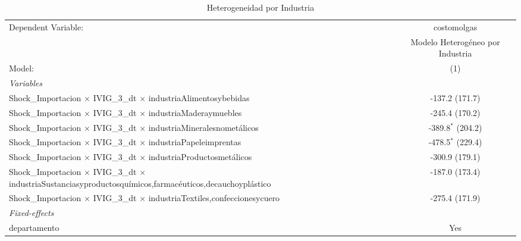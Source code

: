\documentclass[12pt]{article}
\begin{document}
\setcounter{table}{7}
\begin{table}[htbp]
\centering
\begin{threeparttable}

   \caption{Heterogeneidad por Industria}
   \centering
   \small
   \begin{tabular}{lc}
      \tabularnewline \midrule \midrule
      Dependent Variable:                                                                                                         & costomolgas\\  
                                                                                                                                  & Modelo Heterogéneo por Industria \\   
      Model:                                                                                                                      & (1)\\  
      \midrule
      \emph{Variables}\\
      Shock\_Importacion $\times$ IVIG\_3\_dt $\times$ industriaAlimentosybebidas                                                 & -137.2 (171.7)\\   
      Shock\_Importacion $\times$ IVIG\_3\_dt $\times$ industriaMaderaymuebles                                                    & -245.4 (170.2)\\   
      Shock\_Importacion $\times$ IVIG\_3\_dt $\times$ industriaMineralesnometálicos                                              & -389.8$^{*}$ (204.2)\\   
      Shock\_Importacion $\times$ IVIG\_3\_dt $\times$ industriaPapeleimprentas                                                   & -478.5$^{*}$ (229.4)\\   
      Shock\_Importacion $\times$ IVIG\_3\_dt $\times$ industriaProductosmetálicos                                                & -300.9 (179.1)\\   
      Shock\_Importacion $\times$ IVIG\_3\_dt $\times$ industriaSustanciasyproductosquímicos,farmacéuticos,decauchoyplástico      & -187.0 (173.4)\\   
      Shock\_Importacion $\times$ IVIG\_3\_dt $\times$ industriaTextiles,confeccionesycuero                                       & -275.4 (171.9)\\   
      \midrule
      \emph{Fixed-effects}\\
      departamento                                                                                                                & Yes\\  

\end{tabular}
\end{threeparttable}
\end{table}
\end{document}
